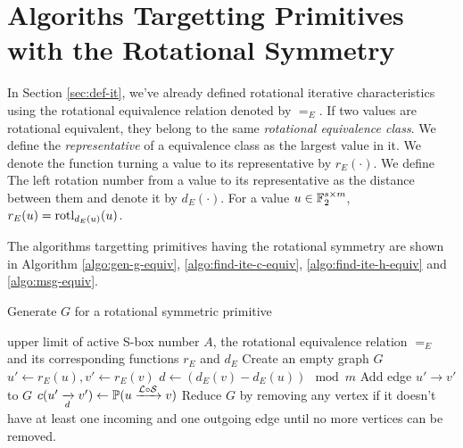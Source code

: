 \section{Algoriths Targetting Primitives with the Rotational Symmetry}\label{sec:equiv}

In Section \ref{sec:def-it}, we've already defined rotational iterative characteristics using the rotational equivalence relation denoted by $=_E$. If two values are rotational equivalent, they belong to the same \textit{rotational equivalence class}. We define the \textit{representative} of a equivalence class as the largest value in it. We denote the function turning a value to its representative by $r_E(\cdot)$. We define The left rotation number from a value to its representative as the distance between them and denote it by $d_E(\cdot)$. For a value $u\in \mathbb{F}_2^{s\times m}$, $r_E(u)=\text{rotl}_{d_E(u)}(u)$. 

The algorithms targetting primitives having the rotational symmetry are shown in Algorithm \ref{algo:gen-g-equiv}, \ref{algo:find-ite-c-equiv}, \ref{algo:find-ite-h-equiv} and \ref{algo:msg-equiv}. 

\begin{algorithm}[htbp]
	\caption{Generate $G$ for a rotational symmetric primitive}
	\label{algo:gen-g-equiv}
	\begin{algorithmic}[1]
		\Require upper limit of active S-box number $A$, the rotational equivalence relation $=_E$ and its corresponding functions $r_E$ and $d_E$
		\Procedure {}{}
                \State Create an empty graph $G$
		\State $u'\leftarrow r_E(u),v'\leftarrow r_E(v)$
                \State $d\leftarrow (d_E(v)-d_E(u))\mod m$
		\State Add edge $u'\rightarrow v'$ to $G$
                \State $c(u'\xrightarrow[d]{} v')\leftarrow \mathbb{P}(u\xrightarrow{\mathcal{L}\circ\mathcal{S}}v)$
		\EndFor
		\EndIf
		\EndFor
                \State Reduce $G$ by removing any vertex if it doesn't have at least one incoming and one outgoing edge until no more vertices can be removed. 
		\EndProcedure
	\end{algorithmic}
\end{algorithm}


